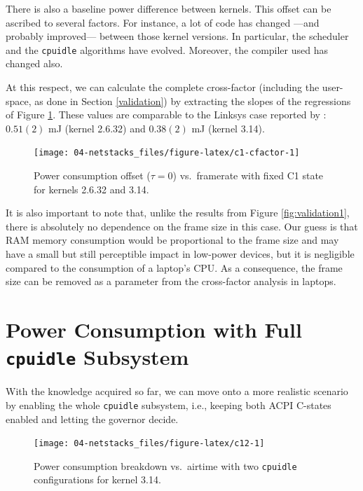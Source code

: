 \documentclass[twoside,nohyper]{tufte-book}
\theoremstyle{definition}
\theoremstyle{definition}
\theoremstyle{definition}
\theoremstyle{remark}
\begin{document}
There is also a baseline power difference between kernels. This offset
can be ascribed to several factors. For instance, a lot of code has
changed ---and probably improved--- between those kernel versions. In
particular, the scheduler and the \texttt{cpuidle} algorithms have
evolved. Moreover, the compiler used has changed also.

At this respect, we can calculate the complete cross-factor (including
the user-space, as done in Section \ref{validation}) by extracting the
slopes of the regressions of Figure \ref{fig:c1-cfactor}. These values
are comparable to the Linksys case reported by \citet{Serrano2014}:
\(0.51(2)\) mJ (kernel 2.6.32) and \(0.38(2)\) mJ (kernel 3.14).




\begin{figure}

{\centering \texttt{[image: 04-netstacks\_files/figure-latex/c1-cfactor-1]} 

}

\caption[Power consumption offset (\(\tau=0\)) vs.~framerate
with fixed C1 state for kernels 2.6.32 and 3.14.]{Power consumption offset (\(\tau=0\)) vs.~framerate
with fixed C1 state for kernels 2.6.32 and 3.14.}\label{fig:c1-cfactor}
\end{figure}

It is also important to note that, unlike the results from Figure
\ref{fig:validation1}, there is absolutely no dependence on the frame
size in this case. Our guess is that RAM memory consumption would be
proportional to the frame size and may have a small but still
perceptible impact in low-power devices, but it is negligible compared
to the consumption of a laptop's CPU. As a consequence, the frame size
can be removed as a parameter from the cross-factor analysis in laptops.

\section{\texorpdfstring{Power Consumption with Full \texttt{cpuidle}
Subsystem}{Power Consumption with Full cpuidle Subsystem}}\label{power-consumption-with-full-cpuidle-subsystem}

With the knowledge acquired so far, we can move onto a more realistic
scenario by enabling the whole \texttt{cpuidle} subsystem, i.e., keeping
both ACPI C-states enabled and letting the governor decide.




\begin{figure}

{\centering \texttt{[image: 04-netstacks\_files/figure-latex/c12-1]} 

}

\caption[Power consumption breakdown vs.~airtime with two
\texttt{cpuidle} configurations for kernel 3.14.]{Power consumption breakdown vs.~airtime with two
\texttt{cpuidle} configurations for kernel 3.14.}\label{fig:c12}
\end{figure}
\end{document}
